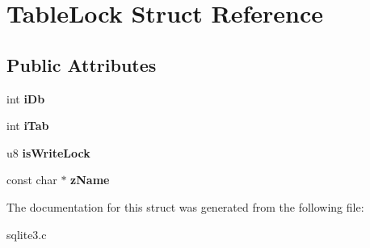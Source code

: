 \hypertarget{structTableLock}{}\section{Table\+Lock Struct Reference}
\label{structTableLock}
\subsection*{Public Attributes}
\begin{DoxyCompactItemize}
\item 
int {\bfseries i\+Db}\hypertarget{structTableLock_ad5cc726ef29ffcca39ec0b72942513f6}{}\label{structTableLock_ad5cc726ef29ffcca39ec0b72942513f6}

\item 
int {\bfseries i\+Tab}\hypertarget{structTableLock_ab25b5d9ba21ed96ed68ce8064ff84e24}{}\label{structTableLock_ab25b5d9ba21ed96ed68ce8064ff84e24}

\item 
u8 {\bfseries is\+Write\+Lock}\hypertarget{structTableLock_a171121af9886ee08044d4b82b991ceeb}{}\label{structTableLock_a171121af9886ee08044d4b82b991ceeb}

\item 
const char $\ast$ {\bfseries z\+Name}\hypertarget{structTableLock_ad1ce077fbd2600dd6d23ec08706dd227}{}\label{structTableLock_ad1ce077fbd2600dd6d23ec08706dd227}

\end{DoxyCompactItemize}


The documentation for this struct was generated from the following file\+:\begin{DoxyCompactItemize}
\item 
sqlite3.\+c\end{DoxyCompactItemize}
